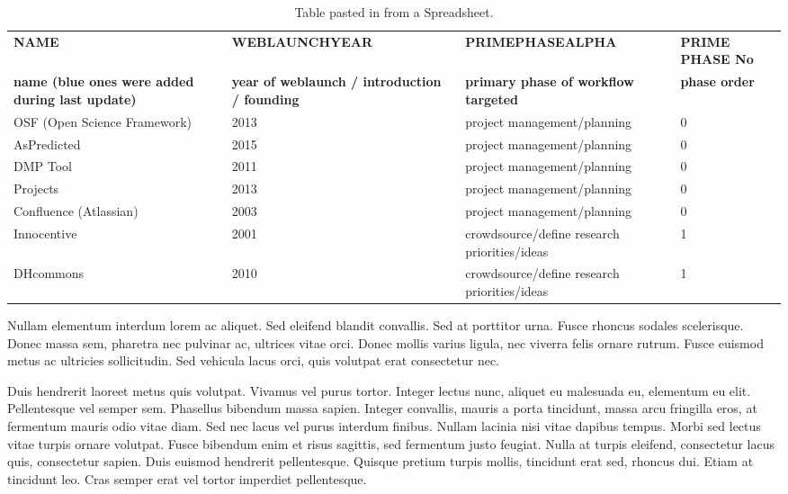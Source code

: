 \documentclass{article}
\begin{document}
\begin{table}
\caption*{Table pasted in from a Spreadsheet.}\label{T16439061}

\begin{tabu} to \textwidth { |X|X|X|X| }
\hline



\textbf{NAME} & \textbf{WEBLAUNCHYEAR} & \textbf{PRIMEPHASEALPHA} & \textbf{PRIME PHASE No}
 \\


\textbf{name (blue ones were added during last update)} & \textbf{year of weblaunch / introduction / founding} & \textbf{primary phase of workflow targeted} & \textbf{phase order}
 \\


OSF (Open Science Framework) & 2013 & project management/planning & 0
 \\


AsPredicted & 2015 & project management/planning & 0
 \\


DMP Tool & 2011 & project management/planning & 0
 \\


Projects & 2013 & project management/planning & 0
 \\


Confluence (Atlassian) & 2003 & project management/planning & 0
 \\


Innocentive & 2001 & crowdsource/define research priorities/ideas  & 1
 \\


DHcommons & 2010 & crowdsource/define research priorities/ideas  & 1
 \\
\hline

\end{tabu}\end{table}





Nullam elementum interdum lorem ac aliquet. Sed eleifend blandit convallis. Sed at porttitor urna. Fusce rhoncus sodales scelerisque. Donec massa sem, pharetra nec pulvinar ac, ultrices vitae orci. Donec mollis varius ligula, nec viverra felis ornare rutrum. Fusce euismod metus ac ultricies sollicitudin. Sed vehicula lacus orci, quis volutpat erat consectetur nec.


Duis hendrerit laoreet metus quis volutpat. Vivamus vel purus tortor. Integer lectus nunc, aliquet eu malesuada eu, elementum eu elit. Pellentesque vel semper sem. Phasellus bibendum massa sapien. Integer convallis, mauris a porta tincidunt, massa arcu fringilla eros, at fermentum mauris odio vitae diam. Sed nec lacus vel purus interdum finibus. Nullam lacinia nisi vitae dapibus tempus. Morbi sed lectus vitae turpis ornare volutpat. Fusce bibendum enim et risus sagittis, sed fermentum justo feugiat. Nulla at turpis eleifend, consectetur lacus quis, consectetur sapien. Duis euismod hendrerit pellentesque. Quisque pretium turpis mollis, tincidunt erat sed, rhoncus dui. Etiam at tincidunt leo. Cras semper erat vel tortor imperdiet pellentesque.
\end{document}
